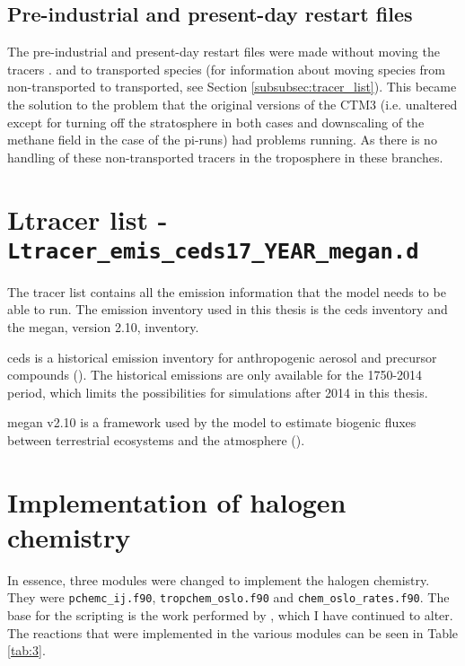 \subsection{Pre-industrial and present-day restart files}\label{sec:PI_and_PD_restart}

The pre-industrial and present-day restart files were made without moving the tracers .  and  to transported species (for information about moving species from non-transported to transported, see Section \ref{subsubsec:tracer_list}). This became the solution to the problem that the original versions of the CTM3 (i.e. unaltered except for turning off the stratosphere in both cases and downscaling of the methane field in the case of the \acrshort{pi}-runs) had problems running. As there is no handling of these non-transported tracers in the troposphere in these branches. 
 
\section{Ltracer list - \texttt{Ltracer\_emis\_ceds17\_YEAR\_megan.d}}\label{subsubsec:Ltracer_list}

The tracer list contains all the emission information that the model needs to be able to run. The emission inventory used in this thesis is the \acrlong{ceds} inventory and the \acrlong{megan}, version 2.10, inventory. 

\medskip

\acrshort{ceds} is a historical emission inventory for anthropogenic aerosol and precursor compounds (\cite{Lund2018}). The historical emissions are only available for the 1750-2014 period, which limits the possibilities for simulations after 2014 in this thesis. 

\medskip

\acrshort{megan} v2.10 is a framework used by the model to estimate biogenic fluxes between terrestrial ecosystems and the atmosphere (\cite{Guenther2012}). 


\section{Implementation of halogen chemistry}

In essence, three modules were changed to implement the halogen chemistry. They were \texttt{pchemc\_ij.f90}, \texttt{tropchem\_oslo.f90} and \texttt{chem\_oslo\_rates.f90}. The base for the scripting is the work performed by \cite{Susanne}, which I have continued to alter.  The reactions that were implemented in the various modules can be seen in Table \ref{tab:3}.


